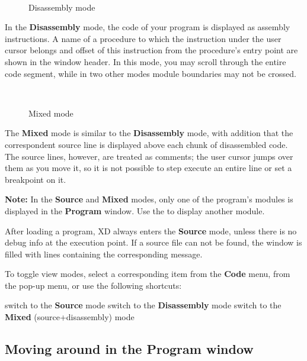 \ifcomment
\begin{figure}[htb]
\begin{center} \ \ \end{center}
\caption{Disassembly mode}
\end{figure}
\fi

In the {\bf Disassembly} mode, the code of your program is displayed
as assembly instructions. A name of a procedure to which the
instruction under the user cursor belongs and offset of this
instruction from the procedure's entry point are shown in the window
header. In this mode, you may scroll through the entire code segment,
while in two other modes module boundaries may not be crossed.

\ifcomment
\begin{figure}[htb]
\begin{center} \ \  \end{center}
\caption{Mixed mode}
\end{figure}
\fi

The {\bf Mixed} mode is similar to the {\bf Disassembly} mode, with
addition that the correspondent source line is displayed
above each chunk of disassembled code. The source lines, however,
are treated as comments; the user cursor jumps over them as you
move it, so it is not possible to step execute an entire line or set
a breakpoint on it.

{\bf Note:} In the {\bf Source} and {\bf Mixed} modes,
only one of the program's modules is displayed in the {\bf Program} window.
Use the 
to display another module.

After loading a program, XD always enters the {\bf Source} mode,
unless there is no debug info at the execution point.
If a source file can not be found, the window is filled
with lines containing the corresponding message.

To toggle view modes, select a corresponding item from the {\bf Code} menu,
from the pop-up menu, or use the following shortcuts:

\KeyListBegin{11 cm}
 {switch to the {\bf Source} mode}
 {switch to the {\bf Disassembly} mode}
 {switch to the {\bf Mixed} (source+disassembly) mode}
\KeyListEnd

\subsection{Moving around in the Program window}
\label{dialog:navigating:moving}

